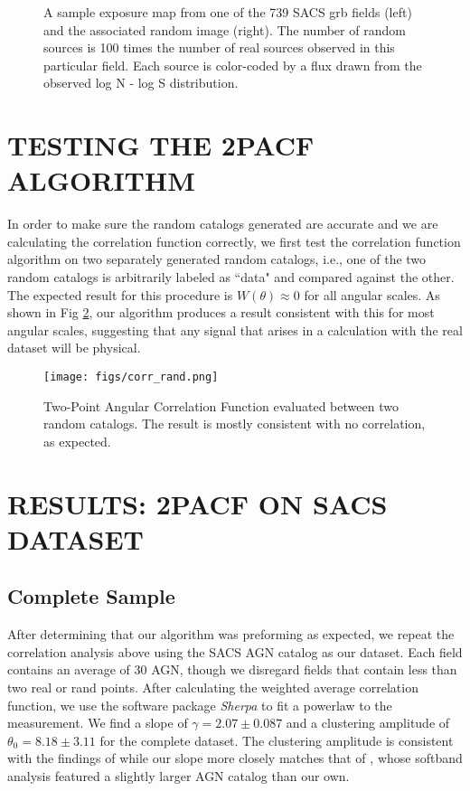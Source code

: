 \documentclass[preprint]{aastex63}
\begin{document}
\begin{figure}[!ht]
    \centering
    
    \label{fig:exp_map}
    \caption{A sample exposure map from one of the 739 SACS grb fields (left) and the associated random image (right). 
    The number of random sources is 100 times the number of real sources observed in this particular field. Each source
    is color-coded by a flux drawn from the observed log N - log S distribution. }
\end{figure}

\section{TESTING THE 2PACF ALGORITHM}
In order to make sure the random catalogs generated are accurate and we are calculating the correlation function correctly,
we first test the correlation function algorithm on two separately generated random catalogs, i.e., one of the two random catalogs 
is arbitrarily labeled as ``data" and compared against the other. 
The expected result for this procedure is  $W(\theta) \approx 0$ for all angular scales.  As shown in Fig \ref{fig:corr_rand}, our algorithm 
produces a result consistent with this  for most angular scales, suggesting that any signal that
arises in a calculation with the real dataset will be physical.
\begin{figure}[!ht]
    \centering
    \texttt{[image: figs/corr\_rand.png]}
    \label{fig:corr_rand}
    \caption{Two-Point Angular Correlation Function evaluated between
    two random catalogs. The result is mostly consistent with no correlation, as expected.}
\end{figure}


\section{RESULTS: 2PACF ON SACS DATASET}
\subsection{Complete Sample}
After determining that our algorithm was preforming as expected, we repeat the correlation analysis above 
using the SACS AGN catalog as our dataset. Each field contains an average of 30 AGN, though we disregard fields 
that contain less than two real or rand points. After calculating the weighted average correlation function,
we use the software package \textit{Sherpa} \citep{sherpa} to fit a powerlaw to the measurement. We find a slope of 
$\gamma = 2.07 \pm 0.087$ and a clustering amplitude of $\theta_0 = 8.18 \pm 3.11$ for the complete dataset. The clustering
amplitude is consistent with the findings of  \citet{elyiv} while our slope more closely matches that of \citet{ebrero}, whose softband analysis
featured a slightly larger AGN catalog than our own. 
\end{document}
